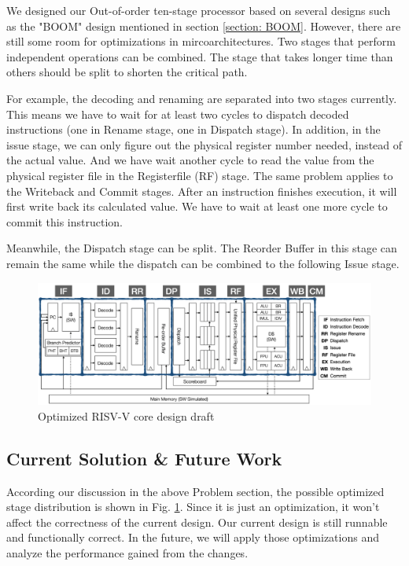 We designed our Out-of-order ten-stage processor based on several designs such as the "BOOM" design mentioned in section \ref{section: BOOM}. However, there are still some room for optimizations in mircoarchitectures. Two stages that perform independent operations can be combined. The stage that takes longer time than others should be split to shorten the critical path.

For example, the decoding and renaming are separated into two stages currently. This means we have to wait for at least two cycles to dispatch decoded instructions (one in Rename stage, one in Dispatch stage). In addition, in the issue stage, we can only figure out the physical register number needed, instead of the actual value. And we have wait another cycle to read the value from the physical register file in the Registerfile (RF) stage. The same problem applies to the Writeback and Commit stages. After an instruction finishes execution, it will first write back its calculated value. We have to wait at least one more cycle to commit this instruction.

Meanwhile, the Dispatch stage can be split. The Reorder Buffer in this stage can remain the same while the dispatch can be combined to the following Issue stage.


\begin{figure}[!htp]
    \centering
    \includegraphics[width=\textwidth]{figure/new_design.png}
    \caption{Optimized RISV-V core design draft}
    \label{fig:opt_core}
\end{figure}

\subsection{Current Solution \& Future Work}
According our discussion in the above Problem section, the possible optimized stage distribution is shown in Fig. \ref{fig:opt_core}. Since it is just an optimization, it won't affect the correctness of the current design. Our current design is still runnable and functionally correct. In the future, we will apply those optimizations and analyze the performance gained from the changes.